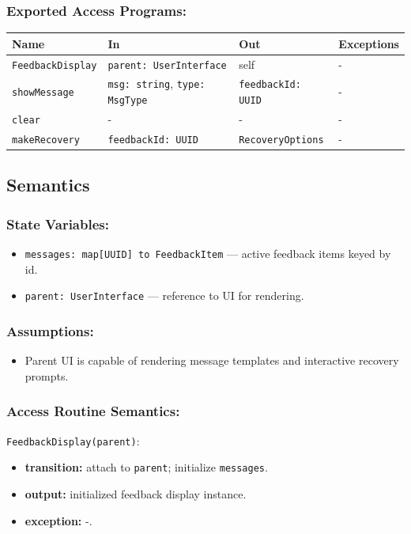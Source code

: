 \documentclass[12pt, titlepage]{article}
\begin{document}
\subsubsection{Exported Access Programs:}

\begin{tabular}{|l|l|l|l|}
\hline
\textbf{Name} & \textbf{In} & \textbf{Out} & \textbf{Exceptions} \\ \hline
\texttt{FeedbackDisplay} & \texttt{parent: UserInterface} & self & - \\ 
\texttt{showMessage} & \texttt{msg: string}, \texttt{type: MsgType} & \texttt{feedbackId: UUID} & - \\ 
\texttt{clear} & - & - & - \\ 
\texttt{makeRecovery} & \texttt{feedbackId: UUID} & \texttt{RecoveryOptions} & - \\ \hline
\end{tabular}

\subsection{Semantics}

\subsubsection{State Variables:}
\begin{itemize}
  \item \texttt{messages: map[UUID] to FeedbackItem} — active feedback items keyed by id.
  \item \texttt{parent: UserInterface} — reference to UI for rendering.
\end{itemize}

\subsubsection{Assumptions:}
\begin{itemize}
  \item Parent UI is capable of rendering message templates and interactive recovery prompts.
\end{itemize}

\subsubsection{Access Routine Semantics:}

\noindent\texttt{FeedbackDisplay(parent)}:
\begin{itemize}
  \item \textbf{transition:} attach to \texttt{parent}; initialize \texttt{messages}.
  \item \textbf{output:} initialized feedback display instance.
  \item \textbf{exception:} -.
\end{itemize}
\end{document}
